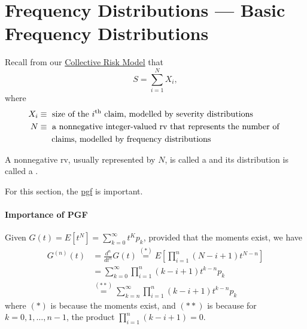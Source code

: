 \documentclass[notoc,notitlepage]{tufte-book}
\begin{document}

\section{Frequency Distributions --- Basic Frequency Distributions}%
\label{sec:frequency_distributions_basic_frequency_distributions}

Recall from our \hyperref[defn:collective_risk_model]{Collective Risk Model} that
\begin{equation*}
  S = \sum_{i=1}^{N} X_i,
\end{equation*}
where
\begin{align*}
  X_i &\equiv \text{ size of the } i\text{\textsuperscript{th} claim, modelled by severity distributions} \\
N &\equiv \text{ a nonnegative integer-valued rv that represents the number of } \\
  &\quad\; \text{ claims, modelled by frequency distributions }
\end{align*}

\begin{defn}\label{defn:counting_distributions_and_rvs}
  A nonnegative rv, usually represented by $N$, is called a  and its distribution is called a .
\end{defn}

\begin{note}
  For this section, the \hyperref[defn:probability_generating_function]{pgf} is important.
\end{note}

\paragraph{Importance of PGF} Given $G(t) = E\left[ t^N \right] = \sum_{k=0}^{\infty} t^K p_k$, provided that the moments exist, we have
\begin{align*}
  G^{(n)}(t) &= \frac{d^n}{dt^n} G(t) \overset{(*)}{=} E\left[ \prod_{i=1}^{n} (N - i + 1)t^{N - n} \right] \\
             &= \sum_{k=0}^{\infty} \prod_{i=1}^{n} (k - i + 1) t^{k - n} p_k \\
             &\overset{(**)}{=} \sum_{k=n}^{\infty} \prod_{i=1}^{n} (k - i + 1) t^{k - n} p_k
\end{align*}
where $(*)$ is because the moments exist, and $(**)$ is because for $k = 0, 1, \ldots, n - 1$, the product $\prod_{i=1}^{n} (k - i + 1) = 0$.
\end{document}
